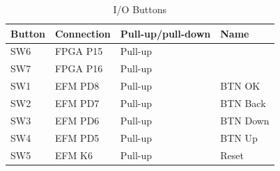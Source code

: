 \begin{table}[]
    \centering
    \begin{tabular}{llll}
        Button & Connection & Pull-up/pull-down & Name     \\
        \hline
        SW6    & FPGA P15   & Pull-up          &          \\
        SW7    & FPGA P16   & Pull-up          &          \\
        SW1    & EFM PD8    & Pull-up          & BTN OK   \\
        SW2    & EFM PD7    & Pull-up          & BTN Back \\
        SW3    & EFM PD6    & Pull-up          & BTN Down \\
        SW4    & EFM PD5    & Pull-up          & BTN Up   \\
        SW5    & EFM K6     & Pull-up          & Reset
    \end{tabular}
    \caption{I/O Buttons}
    \label{tab:Buttons}
\end{table}

